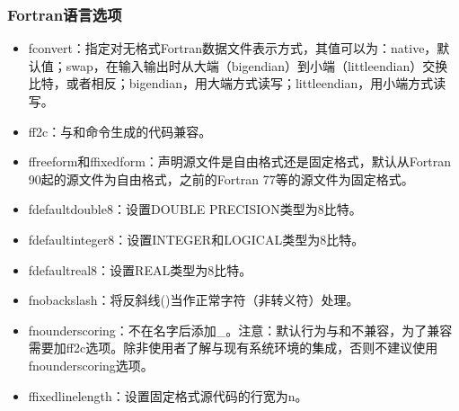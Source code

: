 \documentclass[a4paper,12pt,english]{sphinxmanual}
\begin{document}
\subsubsection{Fortran语言选项}
\label{\detokenize{compiler/gnu:fortran}}\label{\detokenize{compiler/gnu:fortran-2}}\begin{itemize}
\item {} 
\sphinxAtStartPar
\sphinxhyphen{}fconvert：指定对无格式Fortran数据文件表示方式，其值可以为：native，默认值；swap，在输入输出时从大端（big\sphinxhyphen{}endian）到小端（little\sphinxhyphen{}endian）交换比特，或者相反；big\sphinxhyphen{}endian，用大端方式读写；little\sphinxhyphen{}endian，用小端方式读写。

\item {} 
\sphinxAtStartPar
\sphinxhyphen{}ff2c：与和命令生成的代码兼容。

\item {} 
\sphinxAtStartPar
\sphinxhyphen{}ffree\sphinxhyphen{}form和\sphinxhyphen{}ffixed\sphinxhyphen{}form：声明源文件是自由格式还是固定格式，默认从Fortran
90起的源文件为自由格式，之前的Fortran 77等的源文件为固定格式。

\item {} 
\sphinxAtStartPar
\sphinxhyphen{}fdefault\sphinxhyphen{}double\sphinxhyphen{}8：设置DOUBLE PRECISION类型为8比特。

\item {} 
\sphinxAtStartPar
\sphinxhyphen{}fdefault\sphinxhyphen{}integer\sphinxhyphen{}8：设置INTEGER和LOGICAL类型为8比特。

\item {} 
\sphinxAtStartPar
\sphinxhyphen{}fdefault\sphinxhyphen{}real\sphinxhyphen{}8：设置REAL类型为8比特。

\item {} 
\sphinxAtStartPar
\sphinxhyphen{}fno\sphinxhyphen{}backslash：将反斜线()当作正常字符（非转义符）处理。

\item {} 
\sphinxAtStartPar
\sphinxhyphen{}fno\sphinxhyphen{}underscoring：不在名字后添加\_。注意：默认行为与和不兼容，为了兼容需要加\sphinxhyphen{}ff2c选项。除非使用者了解与现有系统环境的集成，否则不建议使用\sphinxhyphen{}fno\sphinxhyphen{}underscoring选项。

\item {} 
\sphinxAtStartPar
\sphinxhyphen{}ffixed\sphinxhyphen{}line\sphinxhyphen{}length\sphinxhyphen{}：设置固定格式源代码的行宽为n。


\end{itemize}
\end{document}

